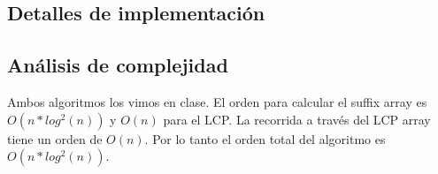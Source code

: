\subsection*{Detalles de implementación}

\subsection*{Análisis de complejidad}

Ambos algoritmos los vimos en clase. El orden para calcular el suffix array es
$O( n*log^2(n) )$ y $O(n)$ para el LCP. La recorrida a través del LCP array tiene un
orden de $O(n)$. Por lo tanto el orden total del algoritmo es $O( n*log^2(n) )$.
